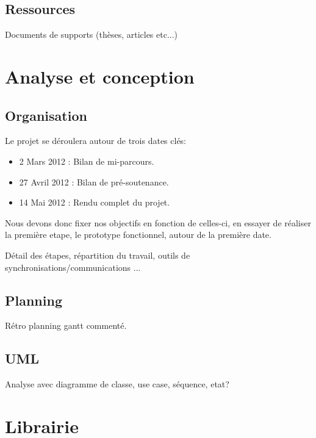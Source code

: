 \documentclass{article}
\begin{document}
		\subsection{Ressources}
			Documents de supports (thèses, articles etc...)
	\section{Analyse et conception}
		\subsection{Organisation}
		Le projet se déroulera autour de trois dates clés:
			\begin{itemize}
			\item 2 Mars 2012 : Bilan de mi-parcours.  
			\item 27 Avril 2012 : Bilan de pré-soutenance.
			\item 14 Mai 2012 : Rendu complet du projet.
			\end{itemize}
			Nous devons donc fixer nos objectifs en fonction de celles-ci, en essayer de réaliser la première etape, le prototype fonctionnel, autour de la première date.
		
			Détail des étapes, répartition du travail, outils de synchronisations/communications ...
		\subsection{Planning}
			Rétro planning gantt commenté.
		\subsection{UML}
			Analyse avec diagramme de classe, use case, séquence, etat?
\newpage
	\section{Librairie}
\end{document}
